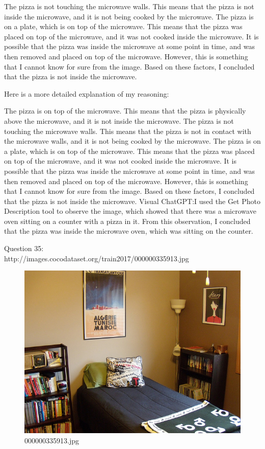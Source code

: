 \begin{enumerate}
        The pizza is not touching the microwave walls. This means that the pizza is not inside the microwave, and it is not being cooked by the microwave.
        The pizza is on a plate, which is on top of the microwave. This means that the pizza was placed on top of the microwave, and it was not cooked inside the microwave.
        It is possible that the pizza was inside the microwave at some point in time, and was then removed and placed on top of the microwave. However, this is something that I cannot know for sure from the image.
        Based on these factors, I concluded that the pizza is not inside the microwave.
        
        Here is a more detailed explanation of my reasoning:
        
        The pizza is on top of the microwave. This means that the pizza is physically above the microwave, and it is not inside the microwave.
        The pizza is not touching the microwave walls. This means that the pizza is not in contact with the microwave walls, and it is not being cooked by the microwave.
        The pizza is on a plate, which is on top of the microwave. This means that the pizza was placed on top of the microwave, and it was not cooked inside the microwave.
        It is possible that the pizza was inside the microwave at some point in time, and was then removed and placed on top of the microwave. However, this is something that I cannot know for sure from the image.
        Based on these factors, I concluded that the pizza is not inside the microwave.
        \subitem Visual ChatGPT:I used the Get Photo Description tool to observe the image, which showed that there was a microwave oven sitting on a counter with a pizza in it. From this observation, I concluded that the pizza was inside the microwave oven, which was sitting on the counter.
    \end{enumerate}
    Question 35:\\http://images.cocodataset.org/train2017/000000335913.jpg
    \begin{figure}[h]
        \centering
        \includegraphics[width=0.8\linewidth]{../image set/easy/000000335913.jpg}
        \caption{000000335913.jpg}
    \end{figure}
